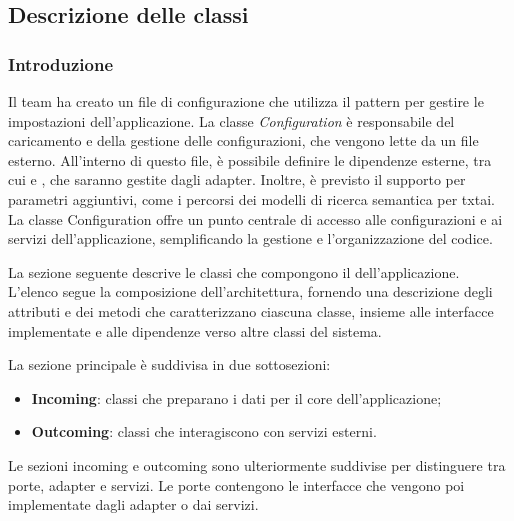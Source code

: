 \subsection{Descrizione delle classi}

\subsubsection{Introduzione}
\par Il team ha creato un file di configurazione che utilizza il pattern  per gestire le impostazioni dell'applicazione. La classe \textit{Configuration} è responsabile del caricamento e della gestione delle configurazioni, che vengono lette da un file  esterno. All'interno di questo file, è possibile definire le dipendenze esterne, tra cui  e , che saranno gestite dagli adapter. Inoltre, è previsto il supporto per parametri aggiuntivi, come i percorsi dei modelli di ricerca semantica per txtai. La classe Configuration offre un punto centrale di accesso alle configurazioni e ai servizi dell'applicazione, semplificando la gestione e l'organizzazione del codice.
\par La sezione seguente descrive le classi che compongono il  dell'applicazione. L'elenco segue la composizione dell'architettura, fornendo una descrizione degli attributi e dei metodi che caratterizzano ciascuna classe, insieme alle interfacce implementate e alle dipendenze verso altre classi del sistema.
\par La sezione principale è suddivisa in due sottosezioni:
\begin{itemize}
  \item \textbf{Incoming}: classi che preparano i dati per il core dell'applicazione;
  \item \textbf{Outcoming}: classi che interagiscono con servizi esterni. 
\end{itemize}

\vspace{0.5\baselineskip}
\par Le sezioni incoming e outcoming sono ulteriormente suddivise per distinguere tra porte, adapter e servizi. Le porte contengono le interfacce che vengono poi implementate dagli adapter o dai servizi.


